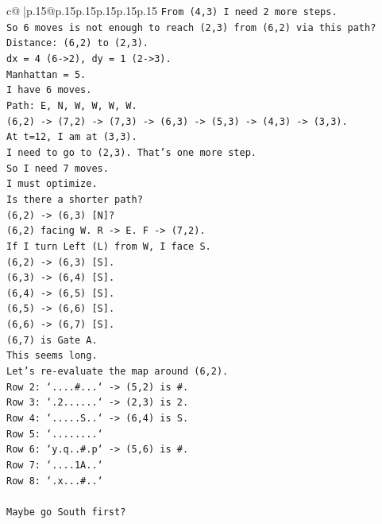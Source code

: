 \documentclass{article}
\begin{document}
{\begin{supertabular}{c@{$\;$}|p{.15\linewidth}@{}p{.15\linewidth}p{.15\linewidth}p{.15\linewidth}p{.15\linewidth}p{.15\linewidth}}
{{{\texttt{From (4,3) I need 2 more steps.} \\
\texttt{So 6 moves is not enough to reach (2,3) from (6,2) via this path?} \\
\texttt{Distance: (6,2) to (2,3).} \\
\texttt{dx = 4 (6{-}>2), dy = 1 (2{-}>3).} \\
\texttt{Manhattan = 5.} \\
\texttt{I have 6 moves.} \\
\texttt{Path: E, N, W, W, W, W.} \\
\texttt{(6,2) {-}> (7,2) {-}> (7,3) {-}> (6,3) {-}> (5,3) {-}> (4,3) {-}> (3,3).} \\
\texttt{At t=12, I am at (3,3).} \\
\texttt{I need to go to (2,3). That's one more step.} \\
\texttt{So I need 7 moves.} \\
\texttt{I must optimize.} \\
\texttt{Is there a shorter path?} \\
\texttt{(6,2) {-}> (6,3) {[}N{]}?} \\
\texttt{(6,2) facing W. R {-}> E. F {-}> (7,2).} \\
\texttt{If I turn Left (L) from W, I face S.} \\
\texttt{(6,2) {-}> (6,3) {[}S{]}.} \\
\texttt{(6,3) {-}> (6,4) {[}S{]}.} \\
\texttt{(6,4) {-}> (6,5) {[}S{]}.} \\
\texttt{(6,5) {-}> (6,6) {[}S{]}.} \\
\texttt{(6,6) {-}> (6,7) {[}S{]}.} \\
\texttt{(6,7) is Gate A.} \\
\texttt{This seems long.} \\
\texttt{Let's re{-}evaluate the map around (6,2).} \\
\texttt{Row 2: `....\#...` {-}> (5,2) is \#.} \\
\texttt{Row 3: `.2......` {-}> (2,3) is 2.} \\
\texttt{Row 4: `.....S..` {-}> (6,4) is S.} \\
\texttt{Row 5: `........`} \\
\texttt{Row 6: `y.q..\#.p` {-}> (5,6) is \#.} \\
\texttt{Row 7: `....1A..`} \\
\texttt{Row 8: `.x...\#..`} \\
\\ 
\texttt{Maybe go South first?} \\
}}}
\end{supertabular}}
\end{document}
